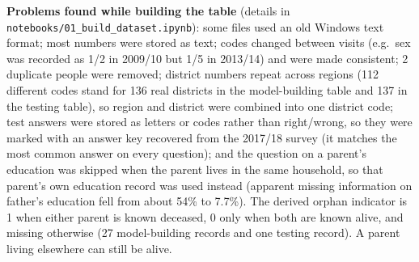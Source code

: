\documentclass[conference,a4paper]{IEEEtran}
\newcommand{\var}[1]{\texttt{#1}}
\begin{document}
\textbf{Problems found while building the table} (details in \var{notebooks/01\_build\_dataset.ipynb}): some files used an old Windows text format; most numbers were stored as text; codes changed between visits (e.g.\ sex was recorded as 1/2 in 2009/10 but 1/5 in 2013/14) and were made consistent; 2 duplicate people were removed; district numbers repeat across regions (112 different codes stand for 136 real districts in the model-building table and 137 in the testing table), so region and district were combined into one district code; test answers were stored as letters or codes rather than right/wrong, so they were marked with an answer key recovered from the 2017/18 survey (it matches the most common answer on every question); and the question on a parent's education was skipped when the parent lives in the same household, so that parent's own education record was used instead (apparent missing information on father's education fell from about 54\% to 7.7\%). The derived orphan indicator is 1 when either parent is known deceased, 0 only when both are known alive, and missing otherwise (27 model-building records and one testing record). A parent living elsewhere can still be alive.
\end{document}
